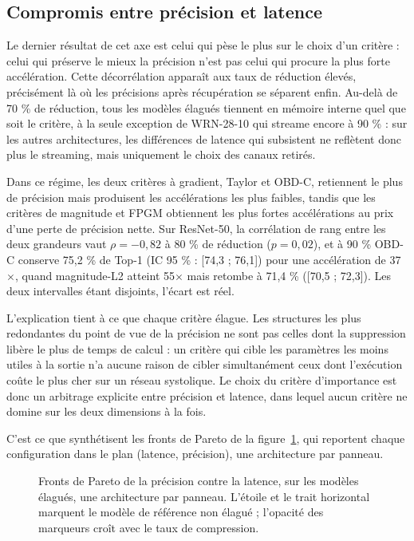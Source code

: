 \documentclass[11pt,a4paper]{report}
\begin{document}
\subsection{Compromis entre précision et latence}

Le dernier résultat de cet axe est celui qui pèse le plus sur le choix d'un critère : celui qui préserve le mieux la précision n'est pas celui qui procure la plus forte accélération. Cette décorrélation apparaît aux taux de réduction élevés, précisément là où les précisions après récupération se séparent enfin. Au-delà de 70 \% de réduction, tous les modèles élagués tiennent en mémoire interne quel que soit le critère, à la seule exception de WRN-28-10 qui streame encore à 90 \% : sur les autres architectures, les différences de latence qui subsistent ne reflètent donc plus le streaming, mais uniquement le choix des canaux retirés.

Dans ce régime, les deux critères à gradient, Taylor et OBD-C, retiennent le plus de précision mais produisent les accélérations les plus faibles, tandis que les critères de magnitude et FPGM obtiennent les plus fortes accélérations au prix d'une perte de précision nette. Sur ResNet-50, la corrélation de rang entre les deux grandeurs vaut $\rho = -0{,}82$ à 80 \% de réduction ($p = 0{,}02$), et à 90 \% OBD-C conserve 75,2 \% de Top-1 (IC 95 \% : [74,3 ; 76,1]) pour une accélération de 37$\times$, quand magnitude-L2 atteint 55$\times$ mais retombe à 71,4 \% ([70,5 ; 72,3]). Les deux intervalles étant disjoints, l'écart est réel.

L'explication tient à ce que chaque critère élague. Les structures les plus redondantes du point de vue de la précision ne sont pas celles dont la suppression libère le plus de temps de calcul : un critère qui cible les paramètres les moins utiles à la sortie n'a aucune raison de cibler simultanément ceux dont l'exécution coûte le plus cher sur un réseau systolique. Le choix du critère d'importance est donc un arbitrage explicite entre précision et latence, dans lequel aucun critère ne domine sur les deux dimensions à la fois.

C'est ce que synthétisent les fronts de Pareto de la figure~\ref{fig:pareto_resnet50}, qui reportent chaque configuration dans le plan (latence, précision), une architecture par panneau.

\begin{figure}[H]
    \centering
    
    \caption{Fronts de Pareto de la précision contre la latence, sur les modèles élagués, une architecture par panneau. L'étoile et le trait horizontal marquent le modèle de référence non élagué ; l'opacité des marqueurs croît avec le taux de compression.}
    \label{fig:pareto_resnet50}
\end{figure}
\end{document}
